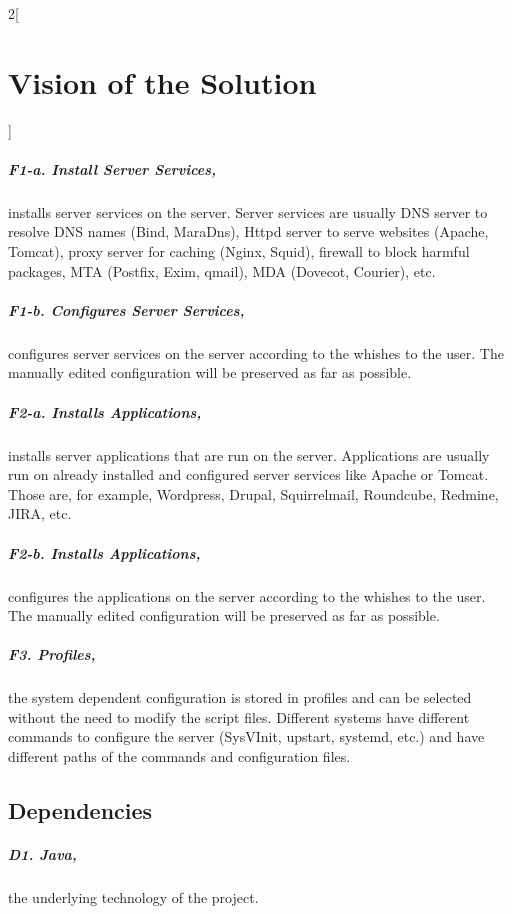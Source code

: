 \begin{multicols}{2}[\chapter{Vision of the Solution}]
\paragraph{F1-a. Install Server Services,} 
installs server services on the server. Server services are usually
DNS server to resolve DNS names (Bind, MaraDns), Httpd server to serve websites (Apache, Tomcat),
proxy server for caching (Nginx, Squid), firewall to block harmful packages, MTA (Postfix, Exim, qmail),
MDA (Dovecot, Courier), etc.

\paragraph{F1-b. Configures Server Services,} 
configures server services on the server according to the whishes to the user.
The manually edited configuration will be preserved as far as possible.

\paragraph{F2-a. Installs Applications,} 
installs server applications that are run on the server. Applications 
are usually run on already installed and configured server services like Apache or Tomcat.
Those are, for example, Wordpress, Drupal, Squirrelmail, Roundcube, Redmine, JIRA, etc.

\paragraph{F2-b. Installs Applications,} 
configures the applications on the server according to the whishes to the user.
The manually edited configuration will be preserved as far as possible.

\paragraph{F3. Profiles,} 
the system dependent configuration is stored in profiles and can be selected
without the need to modify the script files. Different systems have different
commands to configure the server (SysVInit, upstart, systemd, etc.) and have different
paths of the commands and configuration files.

\section{Dependencies}

\paragraph{D1. Java,}
the underlying technology of the project.


\end{multicols}
